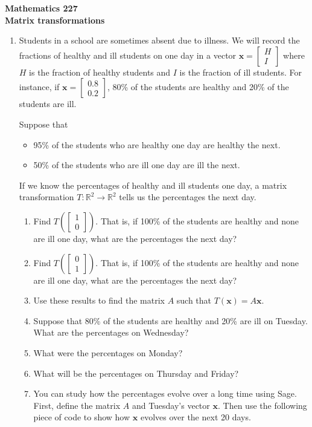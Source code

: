 \documentclass[12pt]{article}
\newcommand{\vs}[1]{\vspace{#1in}}
\newcommand{\xvec}{{\mathbf x}}
\newcommand{\real}{{\mathbb R}}
\newcommand{\twovec}[2]{\left[\begin{array}{r}#1 \\ #2
    \end{array}\right]}
\begin{document}
\noindent
{\bf Mathematics 227} \\ 
{\bf Matrix transformations}

\bigskip
\begin{enumerate}
\item Students in a school are sometimes absent due to illness.
  We will record the fractions of healthy and ill students on one day
  in a vector
  $\xvec = \twovec HI$
  where $H$ is the fraction of healthy students and $I$ is the
  fraction of ill students.  For instance, if
  $\xvec=\twovec{0.8}{0.2}$, 80\% of the students are healthy and 20\%
  of the students are ill.

  Suppose that
  \begin{itemize}
  \item 95\% of the students who are healthy one day are healthy the
    next.
  \item 50\% of the students who are ill one day are ill the next.
  \end{itemize}

  If we know the percentages of healthy and ill students one day, a
  matrix transformation $T:\real^2\to\real^2$ tells us the percentages
  the next day.

  \begin{enumerate}[label=(\alph*)]
  \item Find $T\left(\twovec10\right)$.  That is, if 100\% of the
    students are healthy and none are ill one day, what are the
    percentages the next day?

    \vs{1}
  \item Find $T\left(\twovec01\right)$.  That is, if 100\% of the
    students are healthy and none are ill one day, what are the
    percentages the next day?

    \vs{1}
  \item Use these results to find the matrix $A$ such that $T(\xvec) =
    A\xvec$.

    \vs{1}
    \newpage
  \item Suppose that 80\% of the students are healthy and 20\% are ill
    on Tuesday.  What are the percentages on Wednesday?

    \vs{1}
  \item What were the percentages on Monday?

    \vs{1}
  \item What will be the percentages on Thursday and Friday?

    \vs{1}
  \item You can study how the percentages evolve over a long time
    using Sage.  First, define the matrix $A$ and Tuesday's vector
    $\xvec$.  Then use the following piece of code to show how $\xvec$
    evolves over the next 20 days.


\end{enumerate}
\end{enumerate}
\end{document}
